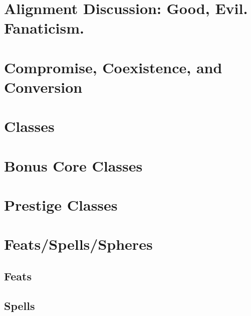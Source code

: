 \documentclass[10pt]{report}
\newcommand{\normalsections}{
\sectionfont{\noindent\rule{\textwidth}{0.015in}\\\nohang}
\subsectionfont{\noindent\rule{\textwidth}{0.005in}\\\nohang}
}
\newcommand{\itemspace}{\setlength{\itemsep}{-1mm}\setlength{\topsep}{-1mm} }
\begin{document}


\pagestyle{fancy}
\linespread{.9}  \small  \normalsize \itemspace \normalsections

\tableofcontents

\chapter{Alignment Discussion: Good, Evil. Fanaticism.}

\chapter{Compromise, Coexistence, and Conversion}

\chapter{Classes}


%

\chapter{Bonus Core Classes}




%

\chapter{Prestige Classes}






\chapter{Feats/Spells/Spheres}

\section{Feats}



\section{Spells}


\end{document}

